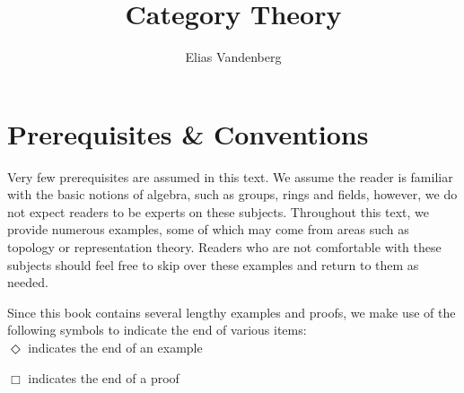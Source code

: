 \documentclass[10pt,oneside]{book}
\theoremstyle{plain}
\theoremstyle{definition}
\theoremstyle{remark}
\numberwithin{equation}{section}
\numberwithin{figure}{section}
\begin{document}
\title{Category Theory}
\author{Elias Vandenberg}
\maketitle

\newpage

\tableofcontents 



\section*{Prerequisites \& Conventions}

Very few prerequisites are assumed in this text. We assume the reader is familiar with the basic notions of algebra, such as groups, rings and fields, however, we do not expect readers to be experts on these subjects. Throughout this text, we provide numerous examples, some of which may come from areas such as topology or representation theory. Readers who are not comfortable with these subjects should feel free to skip over these examples and return to them as needed.

Since this book contains several lengthy examples and proofs, we make use of the following symbols to indicate the end of various items:\\

 $\Diamond$ indicates the end of an example

 $\Box$ indicates the end of a proof
\end{document}

